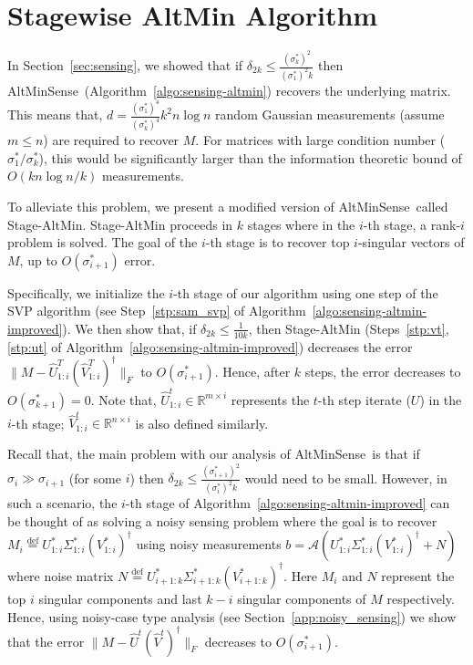 \documentclass[11pt]{article}
\theoremstyle{plain}
\theoremstyle{definition}
\newcommand{\eqdef}{\stackrel{\textrm{def}}{=}}
\newcommand{\aff}{{\mathcal A}}
\newcommand{\Vo}{V^*}
\newcommand{\So}{\Sigma^*}
\newcommand{\Uo}{U^*}
\newcommand{\so}{\sigma^*}
\newcommand{\as}{AltMinSense\ }
\begin{document}
\section{Stagewise AltMin Algorithm}\label{sec:sam}
In Section~\ref{sec:sensing}, we showed that if $\delta_{2k}\leq \frac{(\so_k)^2}{(\so_1)^2k}$ then \as (Algorithm~\ref{algo:sensing-altmin}) recovers the underlying matrix. This means that, $d=\frac{(\so_1)^4}{(\so_k)^4}k^2n\log  n$ random Gaussian measurements (assume $m\leq n$) are required to recover $M$. For matrices with large condition number ($\so_1/ \so_k$), this would be significantly larger than the information theoretic bound of $O(k n \log n/k)$ measurements. %

To alleviate this problem, we present a modified version of \as called Stage-AltMin. Stage-AltMin proceeds in $k$ stages where in the $i$-th stage, a rank-$i$ problem is solved. The goal of the $i$-th stage is to recover top $i$-singular vectors of $M$, up to $O(\so_{i+1})$  error. 

Specifically, we initialize the $i$-th stage of our algorithm using one step of the SVP algorithm \cite{JainMD10} (see Step~\ref{stp:sam_svp} of Algorithm~\ref{algo:sensing-altmin-improved}).  We then show that, if $\delta_{2k}\leq \frac{1}{10k}$, then Stage-AltMin (Steps~\ref{stp:vt}, \ref{stp:ut} of Algorithm~\ref{algo:sensing-altmin-improved}) decreases the error $\|M-\widehat{U}^T_{1:i}(\widehat{V}^T_{1:i})^\dag\|_F$ to $O(\so_{i+1})$. Hence, after $k$ steps, the error decreases to $O(\so_{k+1})=0$. Note that, $\widehat{U}^t_{1:i}\in \mathbb{R}^{m\times i}$ represents the $t$-th step iterate ($U$) in the $i$-th stage; $\widehat{V}^t_{1:i}\in \mathbb{R}^{n\times i}$ is also defined similarly.

Recall that, the main problem with our analysis of \as is that if $\sigma_i\gg \sigma_{i+1}$ (for some $i$) then $\delta_{2k}\leq \frac{(\so_{i+1})^2}{(\so_i)^2k}$ would need to be  small. However, in such a scenario, %
 the $i$-th stage of Algorithm~\ref{algo:sensing-altmin-improved} can be thought of as solving a noisy sensing problem where the goal is to recover $M_i\eqdef\Uo_{1:i}\So_{1:i}(\Vo_{1:i})^\dag$ using noisy measurements $b=\aff(\Uo_{1:i}\So_{1:i}(\Vo_{1:i})^\dag+N)$ where noise matrix $N\eqdef\Uo_{i+1:k}\So_{i+1:k}(\Vo_{i+1:k})^\dag$.
Here $M_i$ and $N$ represent the top $i$ singular components and last $k-i$ singular components of $M$ respectively.
Hence, using noisy-case type analysis (see Section~\ref{app:noisy_sensing}) we show that the error $\|M-\widehat{U}^t(\widehat{V}^t)^\dag\|_F$ decreases to $O(\so_{i+1})$. 
\end{document}
